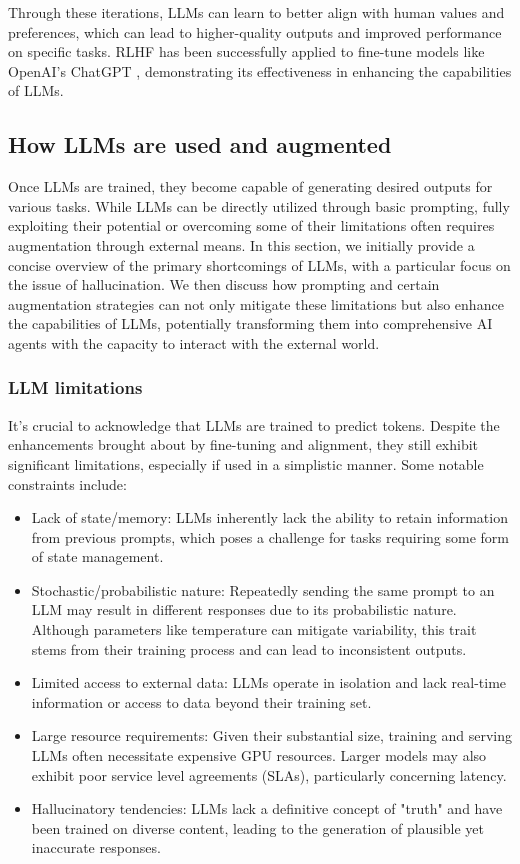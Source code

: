 Through these iterations, LLMs can learn to better align with human values and preferences, which can lead to higher-quality outputs and improved performance on specific tasks. RLHF has been successfully applied to fine-tune models like OpenAI's ChatGPT \cite{ouyang2022training}, demonstrating its effectiveness in enhancing the capabilities of LLMs.

\subsection{How LLMs are used and augmented}

Once LLMs are trained, they become capable of generating desired outputs for various tasks. While LLMs can be directly utilized through basic prompting, fully exploiting their potential or overcoming some of their limitations often requires augmentation through external means. In this section, we initially provide a concise overview of the primary shortcomings of LLMs, with a particular focus on the issue of hallucination. We then discuss how prompting and certain augmentation strategies can not only mitigate these limitations but also enhance the capabilities of LLMs, potentially transforming them into comprehensive AI agents with the capacity to interact with the external world.

\subsubsection*{LLM limitations}

It's crucial to acknowledge that LLMs are trained to predict tokens. Despite the enhancements brought about by fine-tuning and alignment, they still exhibit significant limitations, especially if used in a simplistic manner. Some notable constraints include:

\begin{itemize}
    \item Lack of state/memory: LLMs inherently lack the ability to retain information from previous prompts, which poses a challenge for tasks requiring some form of state management.
    \item Stochastic/probabilistic nature: Repeatedly sending the same prompt to an LLM may result in different responses due to its probabilistic nature. Although parameters like temperature can mitigate variability, this trait stems from their training process and can lead to inconsistent outputs.
    \item Limited access to external data: LLMs operate in isolation and lack real-time information or access to data beyond their training set.
    \item Large resource requirements: Given their substantial size, training and serving LLMs often necessitate expensive GPU resources. Larger models may also exhibit poor service level agreements (SLAs), particularly concerning latency.
    \item Hallucinatory tendencies: LLMs lack a definitive concept of "truth" and have been trained on diverse content, leading to the generation of plausible yet inaccurate responses.
\end{itemize}


